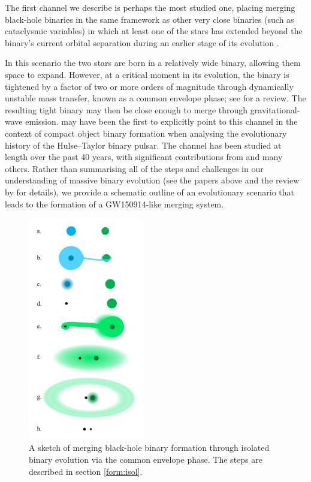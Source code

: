 \documentclass[review]{elsarticle}
\begin{document}
The first channel we describe is perhaps the most studied one, placing merging black-hole binaries in the same framework as other very close binaries (such as cataclysmic variables) in which at least one of the stars has extended beyond the binary's current orbital separation during an earlier stage of its evolution \citep[e.g.,][]{Paczynski:1976}. 

In this scenario the two stars are born in a relatively wide binary, allowing them space to expand.  However, at a critical moment in its evolution, the binary is tightened by a factor of two or more orders of magnitude through dynamically unstable mass transfer, known as a common envelope phase; see \citet{Ivanova:2013} for a review. The resulting tight binary may then be close enough to merge through gravitational-wave emission.  \citet{SmarrBlandford:1976} may have been the first to explicitly point to this channel in the context of compact object binary formation when analysing the evolutionary history of the Hulse--Taylor binary pulsar. The channel has been studied at length over the past 40 years, with significant contributions from \citet{TutukovYungelson:1993,Lipunov:1997,BetheBrown:1998,Nelemans:2001,VossTauris:2003,Pfahl:2005,Dewi:2006,Kalogera:2007,OShaughnessy:2008,Dominik:2012,Belczynski:2016,EldridgeStanway:2016} and many others. Rather than summarising all of the steps and challenges in our understanding of massive binary evolution (see the papers above and the review by \citet{PostnovYungelson:2014} for details), we provide a schematic outline of an evolutionary scenario that leads to the formation of a GW150914-like merging system.

\begin{figure}
	\centering
	\includegraphics[width=0.45\textwidth]{channel1.png}
	\caption{\label{fig:isol_binary} A sketch of merging black-hole binary formation through isolated binary evolution via the common envelope phase.  The steps are described in section \ref{form:isol}.}
\end{figure}
\end{document}
